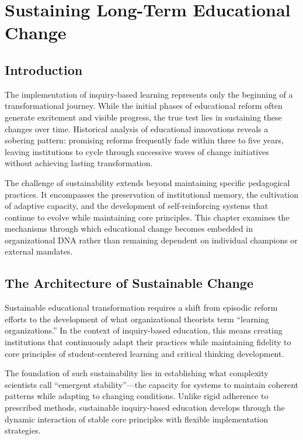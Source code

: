\documentclass[
  Letterpaper,
]{scrbook}
\begin{document}

\chapter{Sustaining Long-Term Educational
Change}\label{sustaining-long-term-educational-change}

\section{Introduction}\label{introduction-7}

The implementation of inquiry-based learning represents only the
beginning of a transformational journey. While the initial phases of
educational reform often generate excitement and visible progress, the
true test lies in sustaining these changes over time. Historical
analysis of educational innovations reveals a sobering pattern:
promising reforms frequently fade within three to five years, leaving
institutions to cycle through successive waves of change initiatives
without achieving lasting transformation.

The challenge of sustainability extends beyond maintaining specific
pedagogical practices. It encompasses the preservation of institutional
memory, the cultivation of adaptive capacity, and the development of
self-reinforcing systems that continue to evolve while maintaining core
principles. This chapter examines the mechanisms through which
educational change becomes embedded in organizational DNA rather than
remaining dependent on individual champions or external mandates.

\section{The Architecture of Sustainable
Change}\label{the-architecture-of-sustainable-change}

Sustainable educational transformation requires a shift from episodic
reform efforts to the development of what organizational theorists term
``learning organizations.'' In the context of inquiry-based education,
this means creating institutions that continuously adapt their practices
while maintaining fidelity to core principles of student-centered
learning and critical thinking development.

The foundation of such sustainability lies in establishing what
complexity scientists call ``emergent stability''---the capacity for
systems to maintain coherent patterns while adapting to changing
conditions. Unlike rigid adherence to prescribed methods, sustainable
inquiry-based education develops through the dynamic interaction of
stable core principles with flexible implementation strategies.
\end{document}

